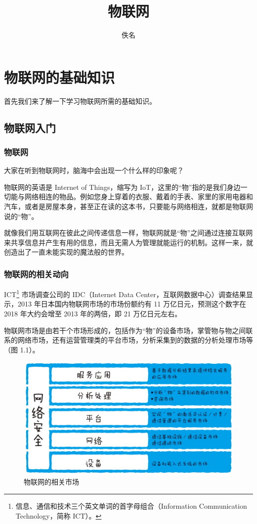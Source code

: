 \documentclass[12pt,UTF8]{ctexbook}
\title{\heiti\zihao{0} 物联网}
\author{佚名}
\date{}
\begin{document}
\maketitle
\tableofcontents

\frontmatter

\mainmatter

\chapter{物联网的基础知识}

首先我们来了解一下学习物联网所需的基础知识。

\section{物联网入门}

\subsection{物联网}

大家在听到物联网时，脑海中会出现一个什么样的印象呢？

物联网的英语是 Internet of Things，缩写为 IoT，这里的“物”指的是我们身边一切能与网络相连的物品。例如您身上穿着的衣服、戴着的手表、家里的家用电器和汽车，或者是房屋本身，甚至正在读的这本书，只要能与网络相连，就都是物联网说的“物”。

就像我们用互联网在彼此之间传递信息一样，物联网就是“物”之间通过连接互联网来共享信息并产生有用的信息，而且无需人为管理就能运行的机制。这样一来，就创造出了一直未能实现的魔法般的世界。

\subsection{物联网的相关动向}

ICT\footnote{信息、通信和技术三个英文单词的首字母组合（Information Communication Technology，简称 ICT）。} 市场调查公司的 IDC（Internet Data Center，互联网数据中心）调查结果显示，2013 年日本国内物联网市场的市场份额约有 11 万亿日元，预测这个数字在 2018 年大约会增至 2013 年的两倍，即 21 万亿日元左右。

物联网市场是由若干个市场形成的，包括作为“物”的设备市场，掌管物与物之间联系的网络市场，还有运营管理类的平台市场，分析采集到的数据的分析处理市场等（图 1.1）。

\begin{figure}[htbp]
	\centering
	\includegraphics[width=1\linewidth]{1}
	\caption{物联网的相关市场}
	\label{fig:1}
\end{figure}
\end{document}

